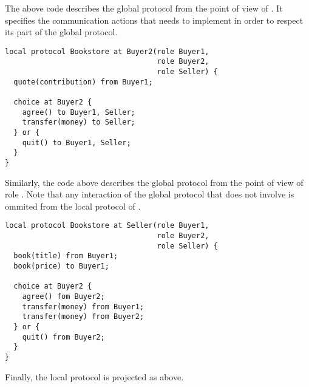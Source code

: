 The above code describes the global protocol from the
point of view of \BuyerOne. It specifies the
communication actions that \BuyerOne needs to implement
in order to respect its part of the global protocol. 

\begin{lstlisting}[caption={Local Protocol for Role \BuyerTwo}]
local protocol Bookstore at Buyer2(role Buyer1,
                                   role Buyer2,
                                   role Seller) {
  quote(contribution) from Buyer1;

  choice at Buyer2 {
    agree() to Buyer1, Seller;
    transfer(money) to Seller;
  } or {
    quit() to Buyer1, Seller;
  }
}
\end{lstlisting}

Similarly, the code above describes the global protocol
from the point of view of role \BuyerTwo. Note that any
interaction of the global protocol that does not involve
\BuyerTwo is ommited from the local protocol of \BuyerTwo.

\begin{lstlisting}[caption={Local Protocol for Role \Seller}]
local protocol Bookstore at Seller(role Buyer1,
                                   role Buyer2,
                                   role Seller) {
  book(title) from Buyer1;
  book(price) to Buyer1;

  choice at Buyer2 {
    agree() fom Buyer2;
    transfer(money) from Buyer1;
    transfer(money) from Buyer2;
  } or {
    quit() from Buyer2;
  }
}
\end{lstlisting}

Finally, the \Seller local protocol is projected as above.
